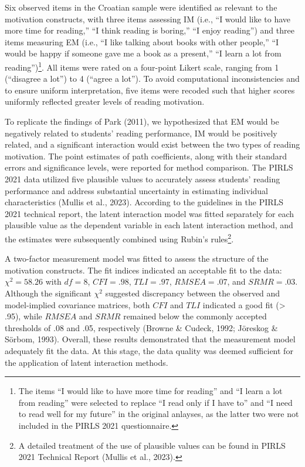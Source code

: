 \documentclass[
  man]{apa6}
\begin{document}
Six observed items in the Croatian sample were identified as relevant to the motivation constructs, with three items assessing IM (i.e., ``I would like to have more time for reading,'' ``I think reading is boring,'' ``I enjoy reading'') and three items measuring EM (i.e., ``I like talking about books with other people,'' ``I would be happy if someone gave me a book as a present,'' ``I learn a lot from reading'')\footnote{The items ``I would like to have more time for reading'' and ``I learn a lot from reading'' were selected to replace ``I read only if I have to'' and ``I need to read well for my future'' in the original anlayses, as the latter two were not included in the PIRLS 2021 questionnaire.}. All items were rated on a four-point Likert scale, ranging from 1 (``disagree a lot'') to 4 (``agree a lot''). To avoid computational inconsistencies and to ensure uniform interpretation, five items were recoded such that higher scores uniformly reflected greater levels of reading motivation.

To replicate the findings of Park (2011), we hypothesized that EM would be negatively related to students' reading performance, IM would be positively related, and a significant interaction would exist between the two types of reading motivation. The point estimates of path coefficients, along with their standard errors and significance levels, were reported for method comparison. The PIRLS 2021 data utilized five plausible values to accurately assess students' reading performance and address substantial uncertainty in estimating individual characteristics (Mullis et al., 2023). According to the guidelines in the PIRLS 2021 technical report, the latent interaction model was fitted separately for each plausible value as the dependent variable in each latent interaction method, and the estimates were subsequently combined using Rubin's rules\footnote{A detailed treatment of the use of plausible values can be found in PIRLS 2021 Technical Report (Mullis et al., 2023).}.

A two-factor measurement model was fitted to assess the structure of the motivation constructs. The fit indices indicated an acceptable fit to the data: \(\chi^2 = 58.26\) with \(\textit{df} = 8\), \(CFI = .98\), \(TLI = .97\), \(RMSEA = .07\), and \(SRMR = .03\). Although the significant \(\chi^2\) suggested discrepancy between the observed and model-implied covariance matrices, both \(CFI\) and \(TLI\) indicated a good fit (\textgreater{} .95), while \(RMSEA\) and \(SRMR\) remained below the commonly accepted thresholds of .08 and .05, respectively (Browne \& Cudeck, 1992; Jöreskog \& Sörbom, 1993). Overall, these results demonstrated that the measurement model adequately fit the data. At this stage, the data quality was deemed sufficient for the application of latent interaction methods.
\end{document}
